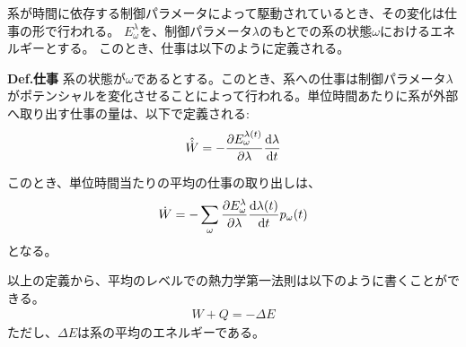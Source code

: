 \documentclass[a4paper,11pt]{jsarticle}
\numberwithin{equation}{section}
\begin{document}
系が時間に依存する制御パラメータによって駆動されているとき、その変化は仕事の形で行われる。
$E_{\omega}^{\lambda}$を、制御パラメータ$\lambda$のもとでの系の状態$\omega$におけるエネルギーとする。
このとき、仕事は以下のように定義される。
  \begin{itembox}[l]{\textbf{Def.仕事}}
    系の状態が$\omega$であるとする。このとき、系への仕事は制御パラメータ$\lambda$がポテンシャルを変化させることによって行われる。単位時間あたりに系が外部へ取り出す仕事の量は、以下で定義される:
    \begin{align}
      \hat{\dot{W}} = -\pdv{E^{\lambda(t)}_{\omega}}{\lambda}\dv{\lambda}{t}
    \end{align}
  \end{itembox}
このとき、単位時間当たりの平均の仕事の取り出しは、
    \begin{align}
        \dot{W} = -\sum_{\omega} \pdv{E^{\lambda}_{\omega}}{\lambda}\dv{\lambda(t)}{t} p_{\omega}(t)
    \end{align}
    となる。

  以上の定義から、平均のレベルでの熱力学第一法則は以下のように書くことができる。
  \begin{align}
    W + Q = -\Delta E
  \end{align}
  ただし、$\Delta E$は系の平均のエネルギーである。\\
\end{document}
